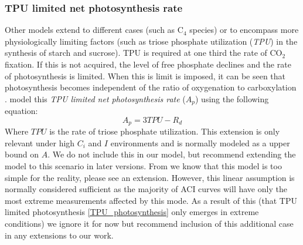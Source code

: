 \documentclass[11pt]{article} %
\begin{document}
\subsubsection{TPU limited net photosynthesis rate} \label{TPU_limited_photosynthesis}
Other models extend to different cases (such as C$_4$ species) or to encompass more physiologically limiting factors (such as triose phosphate utilization (\emph{TPU}) in the synthesis of starch and sucrose). TPU is required at one third the rate of CO$_2$ fixation. If this is not acquired, the level of free phosphate declines and the rate of photosynthesis is limited. When this is limit is imposed, it can be seen that photosynthesis becomes independent of the ratio of oxygenation to carboxylation \cite{ThomasD.SharkeyPhotosynthesisIntactLeaves1985}. \citet{SharkeyFittingphotosyntheticcarbon2007} model this \emph{TPU limited net photosynthesis rate} ($A_p$) using the following equation:
\begin{equation} \label{TPU_photosynthesis}
A_p = 3TPU - R_d
\end{equation}
Where $TPU$ is the rate of triose phosphate utilization. This extension is only relevant under high $C_i$ and $I$ environments and is normally modeled as a upper bound on $A$. We do not include this in our model, but recommend extending the model to this scenario in later versions. From \citet{CaemmererBiochemicalmodelsleaf2000} we know that this model is too simple for the reality, please see \citet{HarleyimprovedmodelC31991} an extension. However, this linear assumption is normally considered sufficient as the majority of ACI curves will have only the most extreme measurements affected by this mode. As a result of this (that TPU limited photosynthesis \eqref{TPU_photosynthesis} only emerges in extreme conditions) we ignore it for now but recommend inclusion of this additional case in any extensions to our work.
\end{document}

